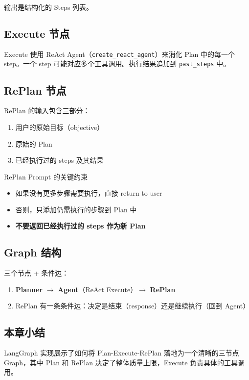 \documentclass[a4paper]{article}
\begin{document}
输出是结构化的 Steps 列表。

\subsection{Execute 节点}

Execute 使用 ReAct Agent（\texttt{create\_react\_agent}）来消化 Plan 中的每一个 step。一个 step 可能对应多个工具调用。执行结果追加到 \texttt{past\_steps} 中。

\subsection{RePlan 节点}

RePlan 的输入包含三部分：
\begin{enumerate}
    \item 用户的原始目标（objective）
    \item 原始的 Plan
    \item 已经执行过的 steps 及其结果
\end{enumerate}

\begin{warningbox}{RePlan Prompt 的关键约束}
\begin{itemize}
    \item 如果没有更多步骤需要执行，直接 return to user
    \item 否则，只添加仍需执行的步骤到 Plan 中
    \item \textbf{不要返回已经执行过的 steps 作为新 Plan}
\end{itemize}
\end{warningbox}

\subsection{Graph 结构}

三个节点 + 条件边：
\begin{enumerate}
    \item \textbf{Planner} $\rightarrow$ \textbf{Agent}（ReAct Execute）$\rightarrow$ \textbf{RePlan}
    \item RePlan 有一条条件边：决定是结束（response）还是继续执行（回到 Agent）
\end{enumerate}

\subsection{本章小结}

LangGraph 实现展示了如何将 Plan-Execute-RePlan 落地为一个清晰的三节点 Graph，其中 Plan 和 RePlan 决定了整体质量上限，Execute 负责具体的工具调用。
\end{document}
